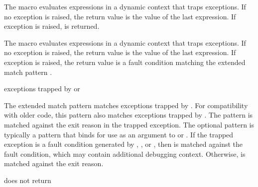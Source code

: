 \begin{syntax}
\end{syntax}
\expandsto{}

The  macro evaluates expressions  
\etc{} in a dynamic context that traps exceptions.  If no exception is
raised, the return value is the value of the last expression. If
exception  is raised,  is
returned.

\begin{syntax}
\end{syntax}
\expandsto{}

The  macro evaluates expressions  
\etc{} in a dynamic context that traps exceptions.  If no exception is
raised, the return value is the value of the last expression. If
exception  is raised, the return value is a fault condition
matching the extended match pattern .

\begin{match-extension}
\end{match-extension}
\matches{} exceptions trapped by  or 

The extended match pattern  matches
exceptions trapped by .
For compatibility with older code, this pattern also matches exceptions
trapped by .
The  pattern is matched against the exit reason in the trapped exception.
The optional  pattern is typically a  pattern that
binds  for use as an argument to  or .
If the trapped exception is a fault condition generated by ,
, or , then  is
matched against the fault condition, which may contain additional debugging context.
Otherwise,  is matched against the exit reason.

\begin{procedure}
\end{procedure}
\returns{} does not return

